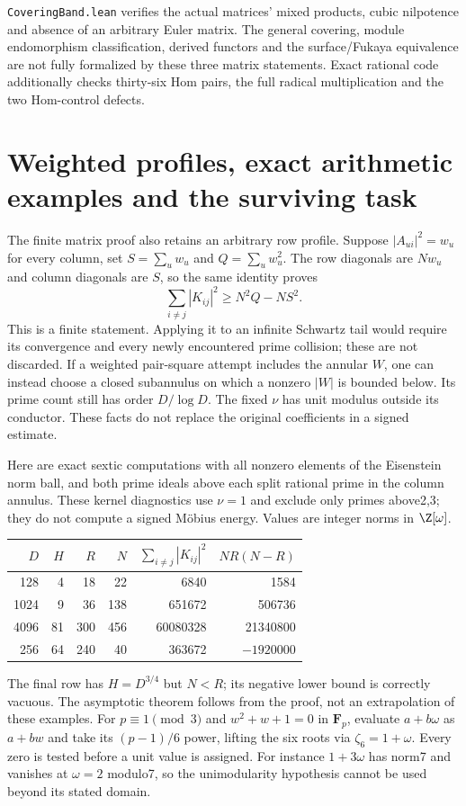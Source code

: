 \documentclass[11pt]{article}
\theoremstyle{definition}\newtheorem{definition}[theorem]{Definition}
\theoremstyle{remark}\newtheorem{remark}[theorem]{Remark}
\begin{document}
\texttt{CoveringBand.lean} verifies the actual matrices' mixed products,
cubic nilpotence and absence of an arbitrary Euler matrix. The general
covering, module endomorphism classification, derived functors and the
surface/Fukaya equivalence are not fully formalized by these three matrix
statements. Exact rational code additionally checks thirty-six Hom pairs,
the full radical multiplication and the two Hom-control defects.


\section{Weighted profiles, exact arithmetic examples and the surviving task}
The finite matrix proof also retains an arbitrary row profile. Suppose
$|A_{ui}|^2=w_u$ for every column, set $S=\sum_u w_u$ and
$Q=\sum_u w_u^2$. The row diagonals are $Nw_u$ and column diagonals are
$S$, so the same identity proves
\[
 \sum_{i\ne j}|K_{ij}|^2\ge N^2Q-NS^2.
\]
This is a finite statement. Applying it to an infinite Schwartz tail would
require its convergence and every newly encountered prime collision;
these are not discarded. If a weighted pair-square attempt includes the
annular $W$, one can instead choose a closed subannulus on which a nonzero
$|W|$ is bounded below. Its prime count still has order $D/\log D$.
The fixed $\nu$ has unit modulus outside its conductor. These facts do not
replace the original coefficients in a signed estimate.

Here are exact sextic computations with all nonzero elements of the
Eisenstein norm ball, and both prime ideals above each split rational prime
in the column annulus. These kernel diagnostics use $\nu=1$ and exclude
only primes above2,3; they do not compute a signed M\"obius energy.
Values are integer norms in $\Z[\omega]$.
\begin{center}\small
\begin{tabular}{rrrrrr}
$D$&$H$&$R$&$N$&$\sum_{i\ne j}|K_{ij}|^2$&$NR(N-R)$\\\hline
128&4&18&22&6840&1584\\
1024&9&36&138&651672&506736\\
4096&81&300&456&60080328&21340800\\
256&64&240&40&363672&$-1920000$
\end{tabular}
\end{center}
The final row has $H=D^{3/4}$ but $N<R$; its negative lower bound is
correctly vacuous. The asymptotic theorem follows from the proof, not an
extrapolation of these examples. For $p\equiv1\pmod3$ and
$w^2+w+1=0$ in $\mathbf F_p$, evaluate $a+b\omega$ as $a+bw$ and take
its $(p-1)/6$ power, lifting the six roots via $\zeta_6=1+\omega$.
Every zero is tested before a unit value is assigned. For instance
$1+3\omega$ has norm7 and vanishes at $\omega=2$ modulo7, so the
unimodularity hypothesis cannot be used beyond its stated domain.
\end{document}
